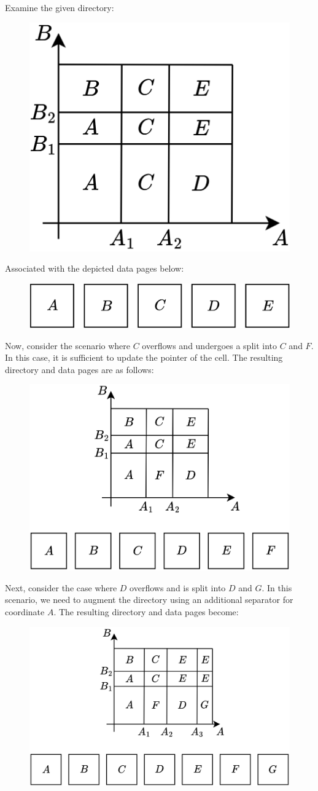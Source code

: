 \begin{example}
    Examine the given directory:
    \begin{figure}[H]
        \centering
        \includegraphics[width=0.25\linewidth]{images/grid1.png}
    \end{figure}
    Associated with the depicted data pages below:
    \begin{figure}[H]
        \centering
        \includegraphics[width=0.4\linewidth]{images/grid2.png}
    \end{figure}
    Now, consider the scenario where $C$ overflows and undergoes a split into $C$ and $F$. 
    In this case, it is sufficient to update the pointer of the cell. 
    The resulting directory and data pages are as follows:
    \begin{figure}[H]
        \centering
        \includegraphics[width=0.5\linewidth]{images/grid3.png}
    \end{figure}
    Next, consider the case where $D$ overflows and is split into $D$ and $G$. 
    In this scenario, we need to augment the directory using an additional separator for coordinate $A$. 
    The resulting directory and data pages become:
    \begin{figure}[H]
        \centering
        \includegraphics[width=0.6\linewidth]{images/grid4.png}
    \end{figure}
\end{example}

